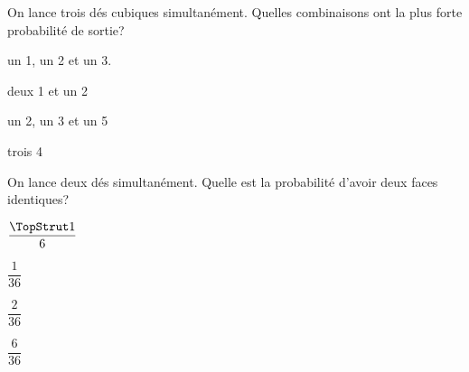 \begin{QCM}
\begin{EnonceCommunQCM}
\end{EnonceCommunQCM}
\begin{GroupeQCM}
\begin{exercice}On lance trois dés cubiques simultanément. Quelles combinaisons ont la plus forte probabilité de sortie?
\begin{ChoixQCM}{4}
\item un 1, un 2 et un 3.
\item deux 1 et un 2
\item un 2, un 3 et un 5
\item trois 4
\end{ChoixQCM}
 \begin{corrige}
    \end{corrige}
\end{exercice}

\end{GroupeQCM}
\end{QCM}

\begin{QCM}
\begin{EnonceCommunQCM}
\end{EnonceCommunQCM}
\begin{GroupeQCM}
\begin{exercice}On lance deux dés simultanément. Quelle est la probabilité d'avoir deux faces identiques?
\begin{ChoixQCM}{4}
\item $\dfrac{\TopStrut 1}{6}$
\item $\dfrac{1}{36}$
\item $\dfrac{2}{36}$
\item $\dfrac{6}{36}$
\end{ChoixQCM}
 \begin{corrige}
    \end{corrige}
\end{exercice}

\end{GroupeQCM}
\end{QCM}
